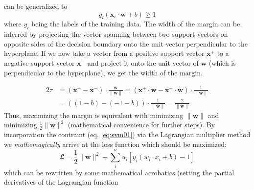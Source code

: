 can be generalized to 
\begin{equation}
	\label{eq:svm01}
	y_i(\mathbf{x}_i \cdot \mathbf{w} + b ) \geqslant 1 %
\end{equation}
where $y_i$ being the labels of the training data. 
The width of the margin can be inferred by projecting the vector spanning between two support vectors 
on opposite sides of the decision boundary onto the unit vector perpendicular to the hyperplane. 
If we now take a vector from a positive support vector $\mathbf{x}^+$ to a negative support vector $\mathbf{x}^-$ and project it onto the unit vector of $\mathbf{w}$ (which is perpendicular to the hyperplane), 
we get the width of the margin. 
\iffalse
\begin{equation}
	\label{eq:svm02}
	\begin{aligned} 
		2\tau &= (\mathbf{x}^+ - \mathbf{x}^-) \cdot \frac{\mathbf{w}}{\|\mathbf{w}\|} \\
			&= (x^+ \cdot \mathbf{w} - x^-\cdot \mathbf{w} ) \cdot \frac{1}{\|\mathbf{w}\|} \\
			&= ( (1-b) - (-1-b) ) \cdot \frac{1}{\|\mathbf{w}\|} \\
			&= \frac{2}{\|w\|}
	\end{aligned}
\end{equation}
\fi
\begin{equation}
	\label{eq:svm02}
	\begin{aligned} 
		2\tau &= (\mathbf{x}^+ - \mathbf{x}^-) \cdot \frac{\mathbf{w}}{\|\mathbf{w}\|} 
			= (\mathbf{x}^+ \cdot \mathbf{w} - \mathbf{x}^-\cdot \mathbf{w} ) \cdot \frac{1}{\|\mathbf{w}\|} \\
			&= ( (1-b) - (-1-b) ) \cdot \frac{1}{\|\mathbf{w}\|} 
			= \frac{2}{\|\mathbf{w}\|}
	\end{aligned}
\end{equation}
Thus, maximizing the margin is equivalent with minimizing $\|\mathbf{w}\|$ and minimizing $\frac{1}{2}\|\mathbf{w}\|^2$ (mathematical convenience for further steps).
By incorporation the contraint (eq. \ref{eq:svm01}) via the Lagrangian multiplier method we 
\textit{mathemagically} arrive at the loss function which should be maximized: 
\begin{equation}
	\label{eq:svm03}
	\mathfrak{L} = \frac{1}{2} \|\mathbf{w}\|^2 - \sum_i^n \alpha_i [ y_i ( w_i \cdot x_i + b) -1 ] 
\end{equation}
which can be rewritten by some mathematical 
acrobatics
(setting the partial derivatives of the Lagrangian function
